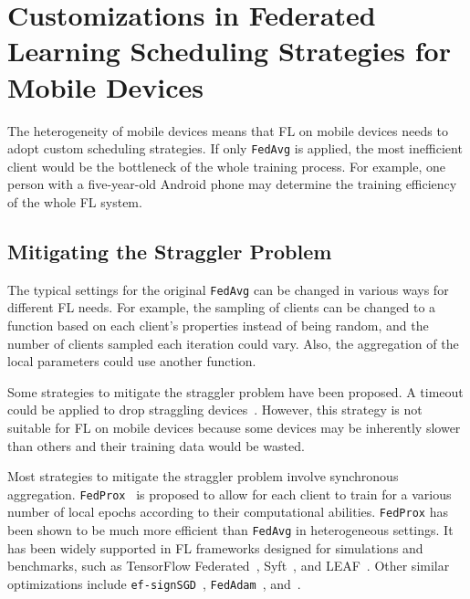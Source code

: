\documentclass[conference]{IEEEtran}
\begin{document}
\section{Customizations in Federated Learning Scheduling Strategies for
    Mobile Devices
}

\label{sec:scheduling}

The heterogeneity of mobile devices means that FL on mobile devices needs to
adopt custom scheduling strategies.
If only \verb|FedAvg| is applied,
the most inefficient client would be the bottleneck of
the whole training process.
For example, one person with a five-year-old Android phone may determine
the training efficiency of the whole FL system.

\subsection{Mitigating the Straggler Problem}

The typical settings for the original \verb|FedAvg| can be changed in
various ways for different FL needs.
For example,
the sampling of clients can be changed to a function based on
each client's properties instead of being random,
and the number of clients sampled each iteration could vary.
Also, the aggregation of the local parameters could use another function.

Some strategies to mitigate the straggler problem have been proposed.
A timeout could be applied to drop
straggling devices~\cite{bonawitz2019towards}.
However, this strategy is not suitable for FL on mobile devices because
some devices may be inherently slower than others and
their training data would be wasted.

Most strategies to mitigate the straggler problem involve
synchronous aggregation.
\verb|FedProx|~\cite{li2020federated} is proposed to
allow for each client to train for a various number of local epochs according to
their computational abilities.
\verb|FedProx| has been shown to be much more efficient than
\verb|FedAvg| in heterogeneous settings.
It has been widely supported in FL frameworks designed for simulations and
benchmarks, such as
TensorFlow Federated~\cite{tff},
Syft~\cite{ryffel2018generic,Ziller2021,hall2021syft}, and
LEAF~\cite{caldas2018leaf}.
Other similar optimizations include
\verb|ef-signSGD|~\cite{karimireddy2019error},
\verb|FedAdam|~\cite{reddi2020adaptive},
and~\cite{luo2021cost}.

\newcommand{\FedML}{FedML~\cite{he2020fedml}}
\newcommand{\Florida}{Project Florida~\cite{madrigal2023project}}
\end{document}
